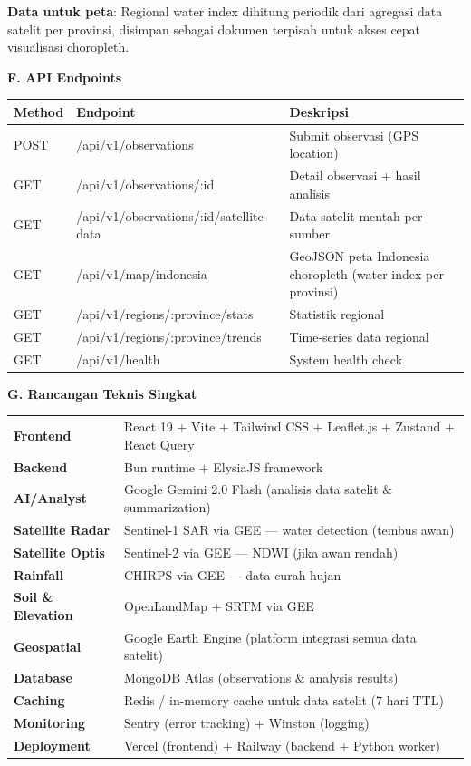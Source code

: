 \documentclass[12pt,a4paper]{article}
\newcommand{\subsectionbox}[1]{%
  \textbf{\large #1}\\[0.3cm]
}
\begin{document}
\textbf{Data untuk peta}: Regional water index dihitung periodik dari agregasi data satelit per provinsi, disimpan sebagai dokumen terpisah untuk akses cepat visualisasi choropleth.

\subsectionbox{F. API Endpoints}

\begin{tabularx}{\textwidth}{|l|l|X|}
  \hline
  \textbf{Method} & \textbf{Endpoint} & \textbf{Deskripsi} \\
  \hline
  POST & /api/v1/observations & Submit observasi (GPS location) \\
  GET & /api/v1/observations/:id & Detail observasi + hasil analisis \\
  GET & /api/v1/observations/:id/satellite-data & Data satelit mentah per sumber \\
  GET & /api/v1/map/indonesia & GeoJSON peta Indonesia choropleth (water index per provinsi) \\
  GET & /api/v1/regions/:province/stats & Statistik regional \\
  GET & /api/v1/regions/:province/trends & Time-series data regional \\
  GET & /api/v1/health & System health check \\
  \hline
\end{tabularx}

\subsectionbox{G. Rancangan Teknis Singkat}

\begin{tabularx}{\textwidth}{|l|X|}
  \hline
  \textbf{Frontend} & React 19 + Vite + Tailwind CSS + Leaflet.js + Zustand + React Query \\[0.2cm]
  \textbf{Backend} & Bun runtime + ElysiaJS framework \\[0.2cm]
  \textbf{AI/Analyst} & Google Gemini 2.0 Flash (analisis data satelit \& summarization) \\[0.2cm]
  \textbf{Satellite Radar} & Sentinel-1 SAR via GEE — water detection (tembus awan) \\[0.2cm]
  \textbf{Satellite Optis} & Sentinel-2 via GEE — NDWI (jika awan rendah) \\[0.2cm]
  \textbf{Rainfall} & CHIRPS via GEE — data curah hujan \\[0.2cm]
  \textbf{Soil \& Elevation} & OpenLandMap + SRTM via GEE \\[0.2cm]
  \textbf{Geospatial} & Google Earth Engine (platform integrasi semua data satelit) \\[0.2cm]
  \textbf{Database} & MongoDB Atlas (observations \& analysis results) \\[0.2cm]
  \textbf{Caching} & Redis / in-memory cache untuk data satelit (7 hari TTL) \\[0.2cm]
  \textbf{Monitoring} & Sentry (error tracking) + Winston (logging) \\[0.2cm]
  \textbf{Deployment} & Vercel (frontend) + Railway (backend + Python worker) \\
  \hline
\end{tabularx}
\end{document}
